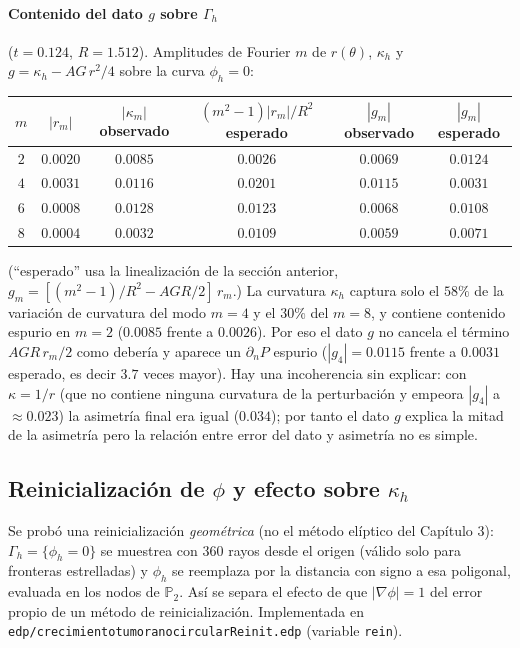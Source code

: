 \paragraph{Contenido del dato $g$ sobre $\Gamma_h$} ($t=0.124$, $R=1.512$). Amplitudes de Fourier $m$ de $r(\theta)$, $\kappa_h$ y $g=\kappa_h-AG\,r^2/4$ sobre la curva $\phi_h=0$:
\begin{center}
\begin{tabular}{cccccc}
\toprule
$m$ & $|r_m|$ & $|\kappa_m|$ observado & $(m^2-1)|r_m|/R^2$ esperado & $|g_m|$ observado & $|g_m|$ esperado\\
\midrule
$2$ & $0.0020$ & $0.0085$ & $0.0026$ & $0.0069$ & $0.0124$\\
$4$ & $0.0031$ & $0.0116$ & $0.0201$ & $0.0115$ & $0.0031$\\
$6$ & $0.0008$ & $0.0128$ & $0.0123$ & $0.0068$ & $0.0108$\\
$8$ & $0.0004$ & $0.0032$ & $0.0109$ & $0.0059$ & $0.0071$\\
\bottomrule
\end{tabular}
\end{center}
(``esperado'' usa la linealización de la sección anterior, $g_m=[(m^2-1)/R^2-AGR/2]\,r_m$.) La curvatura $\kappa_h$ captura solo el $58\%$ de la variación de curvatura del modo $m=4$ y el $30\%$ del $m=8$, y contiene contenido espurio en $m=2$ ($0.0085$ frente a $0.0026$). Por eso el dato $g$ no cancela el término $AGR\,r_m/2$ como debería y aparece un $\partial_nP$ espurio ($|g_4|=0.0115$ frente a $0.0031$ esperado, es decir $3.7$ veces mayor). Hay una incoherencia sin explicar: con $\kappa=1/r$ (que no contiene ninguna curvatura de la perturbación y empeora $|g_4|$ a $\approx0.023$) la asimetría final era igual ($0.034$); por tanto el dato $g$ explica la mitad de la asimetría pero la relación entre error del dato y asimetría no es simple.

\subsection{Reinicialización de $\phi$ y efecto sobre $\kappa_h$}

Se probó una reinicialización \emph{geométrica} (no el método elíptico del Capítulo 3): $\Gamma_h=\{\phi_h=0\}$ se muestrea con 360 rayos desde el origen (válido solo para fronteras estrelladas) y $\phi_h$ se reemplaza por la distancia con signo a esa poligonal, evaluada en los nodos de $\mathbb{P}_2$. Así se separa el efecto de que $|\nabla\phi|=1$ del error propio de un método de reinicialización. Implementada en \texttt{edp/crecimientotumoranocircularReinit.edp} (variable \texttt{rein}).

